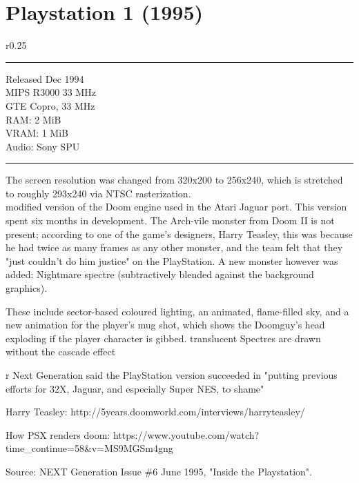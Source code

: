 \section{Playstation 1 (1995)}

\begin{wrapfigure}[14]{r}{0.25\textwidth}{\centering {}}
\hrule 
   Released Dec 1994\\
   MIPS R3000 33 MHz\\
   GTE Copro, 33 MHz\\
   RAM: 2 MiB\\
   VRAM: 1 MiB\\
   Audio: Sony SPU
\hrule 
\end{wrapfigure}

The screen resolution was changed from 320x200 to 256x240, which is stretched to roughly 293x240 via NTSC rasterization.\\
modified version of the Doom engine used in the Atari Jaguar port. This version spent six months in development. The Arch-vile monster from Doom II is not present; according to one of the game's designers, Harry Teasley, this was because he had twice as many frames as any other monster, and the team felt that they "just couldn't do him justice" on the PlayStation. A new monster however was added: Nightmare spectre (subtractively blended against the background graphics).\\
\par
 These include sector-based coloured lighting, an animated, flame-filled sky, and a new animation for the player's mug shot, which shows the Doomguy's head exploding if the player character is gibbed. translucent Spectres are drawn without the cascade effect \\
\par
r Next Generation said the PlayStation version succeeded in "putting previous efforts for 32X, Jaguar, and especially Super NES, to shame" 
\par
Harry Teasley: http://5years.doomworld.com/interviews/harryteasley/\\
\par
{}
How PSX renders doom: https://www.youtube.com/watch?time\_continue=58\&v=MS9MGSm4gng\\
\par
{}
\pagebreak
{}
\par
Source: NEXT Generation Issue \#6 June 1995, "Inside the Playstation".\\
